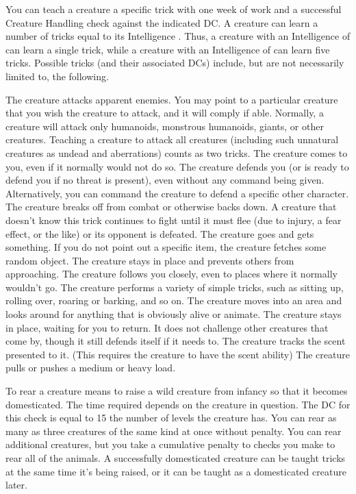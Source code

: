  You can teach a creature a specific trick with one week of work and a successful Creature Handling check against the indicated DC. A creature can learn a number of tricks equal to its Intelligence . Thus, a creature with an Intelligence of  can learn a single trick, while a creature with an Intelligence of  can learn five tricks. Possible tricks (and their associated DCs) include, but are not necessarily limited to, the following.

 The creature attacks apparent enemies. You may point to a particular creature that you wish the creature to attack, and it will comply if able. Normally, a creature will attack only humanoids, monstrous humanoids, giants, or other creatures. Teaching a creature to attack all creatures (including such unnatural creatures as undead and aberrations) counts as two tricks.
 The creature comes to you, even if it normally would not do so.
 The creature defends you (or is ready to defend you if no threat is present), even without any command being given. Alternatively, you can command the creature to defend a specific other character.
 The creature breaks off from combat or otherwise backs down. A creature that doesn't know this trick continues to fight until it must flee (due to injury, a fear effect, or the like) or its opponent is defeated.
 The creature goes and gets something. If you do not point out a specific item, the creature fetches some random object.
 The creature stays in place and prevents others from approaching.
 The creature follows you closely, even to places where it normally wouldn't go.
 The creature performs a variety of simple tricks, such as sitting up, rolling over, roaring or barking, and so on.
 The creature moves into an area and looks around for anything that is obviously alive or animate.
 The creature stays in place, waiting for you to return. It does not challenge other creatures that come by, though it still defends itself if it needs to.
 The creature tracks the scent presented to it. (This requires the creature to have the scent ability)
 The creature pulls or pushes a medium or heavy load.

 To rear a creature means to raise a wild creature from infancy so that it becomes domesticated. The time required depends on the creature in question. The DC for this check is equal to 15 \add the number of levels the creature has. You can rear as many as three creatures of the same kind at once without penalty. You can rear additional creatures, but you take a cumulative  penalty to checks you make to rear all of the animals. A successfully domesticated creature can be taught tricks at the same time it's being raised, or it can be taught as a domesticated creature later.


